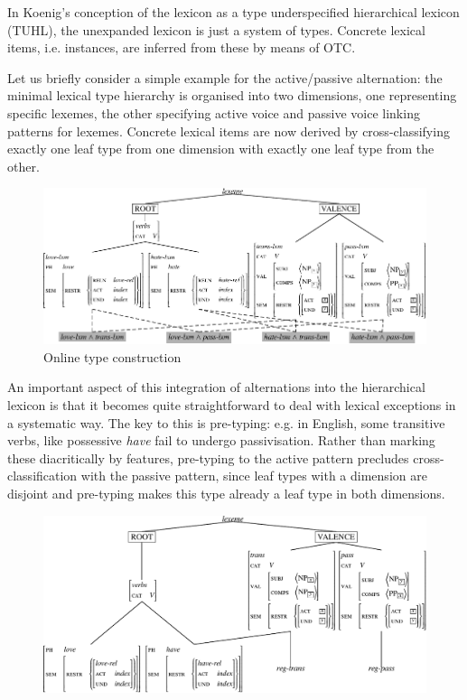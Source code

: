 \documentclass[output=paper
                ,modfonts
                ,nonflat
	        ,collection
	        ,collectionchapter
	        ,collectiontoclongg
 	        ,biblatex
                ,babelshorthands
                ,newtxmath
                ,draftmode
                ,colorlinks, citecolor=brown
]{./langsci/langscibook}
\begin{document}
{In Koenig's conception of the lexicon as a type underspecified
hierarchical lexicon (TUHL), the unexpanded lexicon is just a system of
types. Concrete lexical items, i.e. instances, are inferred from these
by means of OTC. 

Let us briefly consider a simple example for the active/passive
alternation: the minimal lexical type hierarchy is organised into two
dimensions, one representing specific lexemes, the other specifying
active voice and passive voice linking patterns for lexemes. Concrete
lexical items are now derived by cross-classifying exactly one leaf
type from one dimension with exactly one leaf type from the other.

\begin{figure}[htb]
  \centering
  \includegraphics[scale=.84]{figures/OTC-crop.pdf}
  
  \caption{Online type construction}
  \label{fig:KoenigDyn}
\end{figure}

An important aspect of this integration of alternations
into the hierarchical lexicon is that it becomes quite straightforward 
to deal with lexical exceptions in a systematic way. The key to this
is pre-typing: e.g. in English, some transitive verbs, like possessive
\textit{have} fail to undergo passivisation. Rather than marking these
diacritically by features, pre-typing to the active pattern precludes
cross-classification with the passive pattern, since leaf types with a
dimension are disjoint and pre-typing makes this type already a leaf
type in both dimensions. 

\begin{figure}[htb]
  \centering
  \includegraphics[scale=.63]{figures/pretyping-crop.pdf}


\end{figure}}
\end{document}
